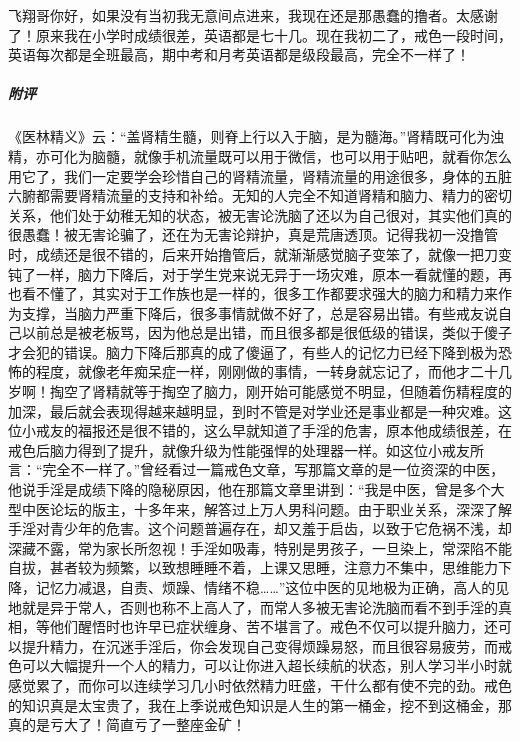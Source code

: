 \begin{case}
    飞翔哥你好，如果没有当初我无意间点进来，我现在还是那愚蠢的撸者。太感谢了！原来我在小学时成绩很差，英语都是七十几。现在我初二了，戒色一段时间，英语每次都是全班最高，期中考和月考英语都是级段最高，完全不一样了！
    \subparagraph{附评} 《医林精义》云：“盖肾精生髓，则脊上行以入于脑，是为髓海。”肾精既可化为浊精，亦可化为脑髓，就像手机流量既可以用于微信，也可以用于贴吧，就看你怎么用它了，我们一定要学会珍惜自己的肾精流量，肾精流量的用途很多，身体的五脏六腑都需要肾精流量的支持和补给。无知的人完全不知道肾精和脑力、精力的密切关系，他们处于幼稚无知的状态，被无害论洗脑了还以为自己很对，其实他们真的很愚蠢！被无害论骗了，还在为无害论辩护，真是荒唐透顶。记得我初一没撸管时，成绩还是很不错的，后来开始撸管后，就渐渐感觉脑子变笨了，就像一把刀变钝了一样，脑力下降后，对于学生党来说无异于一场灾难，原本一看就懂的题，再也看不懂了，其实对于工作族也是一样的，很多工作都要求强大的脑力和精力来作为支撑，当脑力严重下降后，很多事情就做不好了，总是容易出错。有些戒友说自己以前总是被老板骂，因为他总是出错，而且很多都是很低级的错误，类似于傻子才会犯的错误。脑力下降后那真的成了傻逼了，有些人的记忆力已经下降到极为恐怖的程度，就像老年痴呆症一样，刚刚做的事情，一转身就忘记了，而他才二十几岁啊！掏空了肾精就等于掏空了脑力，刚开始可能感觉不明显，但随着伤精程度的加深，最后就会表现得越来越明显，到时不管是对学业还是事业都是一种灾难。这位小戒友的福报还是很不错的，这么早就知道了手淫的危害，原本他成绩很差，在戒色后脑力得到了提升，就像升级为性能强悍的处理器一样。如这位小戒友所言：“完全不一样了。”曾经看过一篇戒色文章，写那篇文章的是一位资深的中医，他说手淫是成绩下降的隐秘原因，他在那篇文章里讲到：“我是中医，曾是多个大型中医论坛的版主，十多年来，解答过上万人男科问题。由于职业关系，深深了解手淫对青少年的危害。这个问题普遍存在，却又羞于启齿，以致于它危祸不浅，却深藏不露，常为家长所忽视！手淫如吸毒，特别是男孩子，一旦染上，常深陷不能自拔，甚者较为频繁，以致想睡睡不着，上课又思睡，注意力不集中，思维能力下降，记忆力减退，自责、烦躁、情绪不稳……”这位中医的见地极为正确，高人的见地就是异于常人，否则也称不上高人了，而常人多被无害论洗脑而看不到手淫的真相，等他们醒悟时也许早已症状缠身、苦不堪言了。戒色不仅可以提升脑力，还可以提升精力，在沉迷手淫后，你会发现自己变得烦躁易怒，而且很容易疲劳，而戒色可以大幅提升一个人的精力，可以让你进入超长续航的状态，别人学习半小时就感觉累了，而你可以连续学习几小时依然精力旺盛，干什么都有使不完的劲。戒色的知识真是太宝贵了，我在上季说戒色知识是人生的第一桶金，挖不到这桶金，那真的是亏大了！简直亏了一整座金矿！
\end{case}

